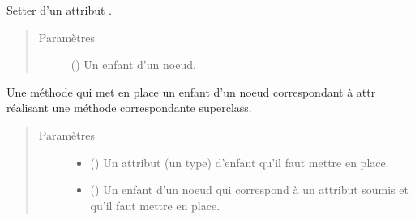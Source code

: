 \documentclass[letterpaper,10pt,french]{sphinxmanual}
\begin{document}
\begin{fulllineitems}
\begin{fulllineitems}
\end{fulllineitems}


\begin{fulllineitems}
\label{\detokenize{index:StrategyTree.Repair.set_child}}
Setter d’un attribut .
\begin{quote}\begin{description}
\item[{Paramètres}] \leavevmode
{} ({\hyperref[\detokenize{index:StrategyTree.NodeST}]{}}\sphinxstyleliteralemphasis{\sphinxupquote{, }}) \textendash{} Un enfant d’un noeud.

\end{description}\end{quote}

\end{fulllineitems}


\begin{fulllineitems}
\label{\detokenize{index:StrategyTree.Repair.set_child_by_attribute}}
Une méthode qui met en place un enfant d’un noeud correspondant à attr réalisant une méthode correspondante
superclass.
\begin{quote}\begin{description}
\item[{Paramètres}] \leavevmode\begin{itemize}
\item {} 
 () \textendash{} Un attribut (un type) d’enfant qu’il faut mettre en place.

\item {} 
 ({\hyperref[\detokenize{index:StrategyTree.NodeST}]{}}\sphinxstyleliteralemphasis{\sphinxupquote{, }}) \textendash{} Un enfant d’un noeud qui correspond à un attribut soumis et qu’il faut mettre en place.

\end{itemize}

\end{description}\end{quote}

\end{fulllineitems}


\end{fulllineitems}
\end{document}

